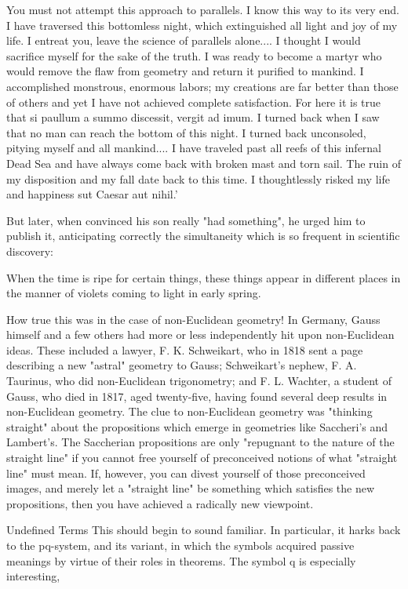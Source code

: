    You must not attempt this approach to parallels. I know this way to its very end. I have
   traversed this bottomless night, which extinguished all light and joy of my life. I entreat
   you, leave the science of parallels alone.... I thought I would sacrifice myself for the sake
   of the truth. I was ready to become a martyr who would remove the flaw from geometry
   and return it purified to mankind. I accomplished monstrous, enormous labors; my
   creations are far better than those of others and yet I have not achieved complete
   satisfaction. For here it is true that si paullum a summo discessit, vergit ad imum. I turned
   back when I saw that no man can reach the bottom of this night. I turned back unconsoled,
   pitying myself and all mankind.... I have traveled past all reefs of this infernal Dead Sea
   and have always come back with broken mast and torn sail. The ruin of my disposition and
   my fall date back to this time. I thoughtlessly risked my life and happiness sut Caesar aut
   nihil.'

       But later, when convinced his son really "had something", he urged him to
publish it, anticipating correctly the simultaneity which is so frequent in scientific
discovery:

   When the time is ripe for certain things, these things appear in different places in
   the manner of violets coming to light in early spring.

        How true this was in the case of non-Euclidean geometry! In Germany, Gauss
himself and a few others had more or less independently hit upon non-Euclidean ideas.
These included a lawyer, F. K. Schweikart, who in 1818 sent a page describing a new
"astral" geometry to Gauss; Schweikart's nephew, F. A. Taurinus, who did non-Euclidean
trigonometry; and F. L. Wachter, a student of Gauss, who died in 1817, aged twenty-five,
having found several deep results in non-Euclidean geometry.
        The clue to non-Euclidean geometry was "thinking straight" about the
propositions which emerge in geometries like Saccheri's and Lambert's. The Saccherian
propositions are only "repugnant to the nature of the straight line" if you cannot free
yourself of preconceived notions of what "straight line" must mean. If, however, you can
divest yourself of those preconceived images, and merely let a "straight line" be
something which satisfies the new propositions, then you have achieved a radically new
viewpoint.

                                     Undefined Terms
This should begin to sound familiar. In particular, it harks back to the pq-system, and its
variant, in which the symbols acquired passive meanings by virtue of their roles in
theorems. The symbol q is especially interesting,




